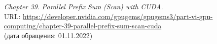 \begin{thebibliography}{99}

{\itshape Chapter 39. Parallel Prefix Sum (Scan) with CUDA.}\\
URL: \url{https://developer.nvidia.com/gpugems/gpugems3/part-vi-gpu-computing/chapter-39-parallel-prefix-sum-scan-cuda}\\
(дата обращения: 01.11.2022)


\end{thebibliography}
